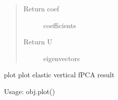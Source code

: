\documentclass[letterpaper,10pt,english]{sphinxmanual}
\begin{document}
\begin{fulllineitems}
\begin{fulllineitems}
\begin{quote}
\begin{description}
\item[{Return coef}] \leavevmode
coefficients

\item[{Return U}] \leavevmode
eigenvectors

\end{description}\end{quote}

\end{fulllineitems}


\begin{fulllineitems}
\label{\detokenize{fPCA:fPCA.fdajpca.plot}}
plot plot elastic vertical fPCA result

Usage: obj.plot()

\end{fulllineitems}


\end{fulllineitems}

\end{document}
